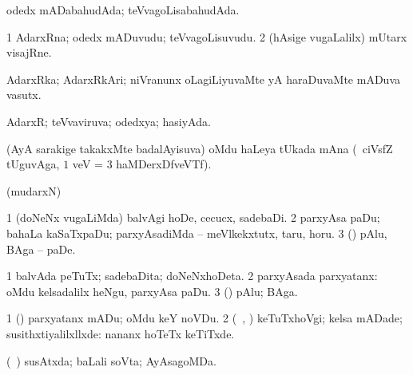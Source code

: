 {{{{{{\bentry
{} 
\gl{\gu}
\expl{}
\bmng
odedx mADabahudAda; teVvagoLisabahudAda. 
\emng
\eentry

\bentry
{} 
\gl{\nA}
\expl{}
\bmng
\bnum
\num{1} AdarxRna; odedx mADuvudu; teVvagoLisuvudu. 
\num{2} (hAsige \mo vugaLalilx) mUtarx visajRne. 
\enum
\emng
\eentry

\bentry
{} 
\gl{\nA}
\expl{}
\bmng
AdarxRka; AdarxRkAri; niVranunx oLagiLiyuvaMte yA haraDuvaMte mADuva vasutx. 
\emng
\eentry

\bentry
{} 
\gl{\gu}
\expl{}
\bmng
AdarxR; teVvaviruva; odedxya; hasiyAda. 
\emng
\eentry

\bentry
{} 
\bmng
{} 
\emng
\eentry

\bentry 
{} 
\gl{\nA}
\expl{}
\bmng
(AyA sarakige takakxMte badalAyisuva) oMdu haLeya tUkada mAna (\udA\ ciVsfZ tUguvAga, $1$ veV = $3$ haMDerxDfveVTf). 
\emng
\eentry

\bentry
{} 
\gl{\saMkiSx}
\expl{}
\bmng
(mudarxN)  
\emng
\eentry

\bentry
{} 
\gl{\saMkiSx}
\expl{}
\bmng
{} 
\emng
\eentry

\bentry
{} 
\gl{\saMkiSx}
\expl{}
\bmng
{} 
\emng
\eentry

\bentry
{} 
\gl{\sakirx}
\expl{}
\bmng
\bnum
\num{1} (doNeNx \mo vugaLiMda) balvAgi hoDe, cecucx, sadebaDi. 
\num{2} parxyAsa paDu; bahaLa kaSaTxpaDu; parxyAsadiMda -- meVlkekxtutx, taru, horu. 
\num{3} (\ashi) pAlu, BAga -- paDe. 
\enum
\emng
\eentry

\bentry
{} 
\gl{\nA}
\expl{}
\bmng
\bnum
\num{1} balvAda peTuTx; sadebaDita; doNeNxhoDeta. 
\num{2} parxyAsada parxyatanx:  oMdu kelsadalilx heNgu, parxyAsa paDu. 
\num{3} (\ashi) pAlu; BAga. 
\enum
\emng

\noindent 
\gl{\pagu}
\expl{}
\bmng
\bnum
\num{1}  (\ashi) parxyatanx mADu; oMdu keY noVDu. 
\num{2}  (\kanmu\ \ame, \ashi) keTuTxhoVgi; kelsa mADade; susithxtiyalilxllxde:  nananx hoTeTx keTiTxde. 
\enum
\emng
\eentry

\bentry
{} 
\gl{\gu}
\expl{}
\bmng
(\kanmu\ \birx) susAtxda; baLali soVta; AyAsagoMDa. 
\emng
\eentry

}}}}}}
